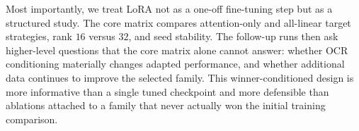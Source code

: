 Most importantly, we treat LoRA not as a one-off fine-tuning step but as a structured study. The core matrix compares attention-only and all-linear target strategies, rank $16$ versus $32$, and seed stability. The follow-up runs then ask higher-level questions that the core matrix alone cannot answer: whether OCR conditioning materially changes adapted performance, and whether additional data continues to improve the selected family. This winner-conditioned design is more informative than a single tuned checkpoint and more defensible than ablations attached to a family that never actually won the initial training comparison.
